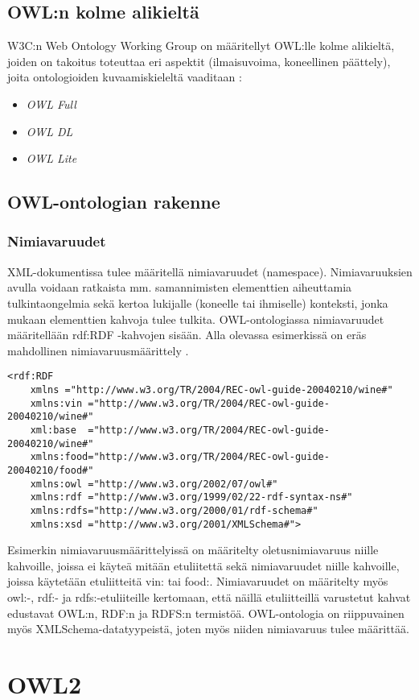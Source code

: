 \documentclass[a4paper,10pt]{article}
\begin{document}
\subsection{OWL:n kolme alikieltä}

W3C:n Web Ontology Working Group on määritellyt OWL:lle kolme alikieltä, joiden on takoitus toteuttaa eri aspektit (ilmaisuvoima, koneellinen päättely), joita ontologioiden kuvaamiskieleltä vaaditaan \cite{MH04}:

\begin{itemize}
 \item \textit{OWL Full}
 \item \textit{OWL DL}
 \item \textit{OWL Lite}
\end{itemize}

\subsection{OWL-ontologian rakenne}

\subsubsection{Nimiavaruudet}
XML-dokumentissa tulee määritellä nimiavaruudet (namespace). Nimiavaruuksien avulla voidaan ratkaista mm. samannimisten elementtien aiheuttamia tulkintaongelmia sekä kertoa lukijalle (koneelle tai ihmiselle) konteksti, jonka mukaan elementtien kahvoja tulee tulkita. OWL-ontologiassa nimiavaruudet määritellään rdf:RDF -kahvojen sisään. Alla olevassa esimerkissä on eräs mahdollinen nimiavaruusmäärittely \cite{BHL01}. 
\begin{verbatim}
<rdf:RDF 
    xmlns ="http://www.w3.org/TR/2004/REC-owl-guide-20040210/wine#" 
    xmlns:vin ="http://www.w3.org/TR/2004/REC-owl-guide-20040210/wine#"       
    xml:base  ="http://www.w3.org/TR/2004/REC-owl-guide-20040210/wine#"       
    xmlns:food="http://www.w3.org/TR/2004/REC-owl-guide-20040210/food#"    
    xmlns:owl ="http://www.w3.org/2002/07/owl#"
    xmlns:rdf ="http://www.w3.org/1999/02/22-rdf-syntax-ns#"
    xmlns:rdfs="http://www.w3.org/2000/01/rdf-schema#"
    xmlns:xsd ="http://www.w3.org/2001/XMLSchema#">
\end{verbatim}
Esimerkin nimiavaruusmäärittelyissä on määritelty oletusnimiavaruus niille kahvoille, joissa ei käyteä mitään etuliitettä sekä nimiavaruudet niille kahvoille, joissa käytetään etuliitteitä vin: tai food:. Nimiavaruudet on määritelty myös owl:-, rdf:- ja rdfs:-etuliiteille kertomaan, että näillä etuliitteillä varustetut kahvat edustavat OWL:n, RDF:n ja RDFS:n termistöä. OWL-ontologia on riippuvainen myös XMLSchema-datatyypeistä, joten myös niiden nimiavaruus tulee määrittää. 
\section{OWL2}



\end{document}
